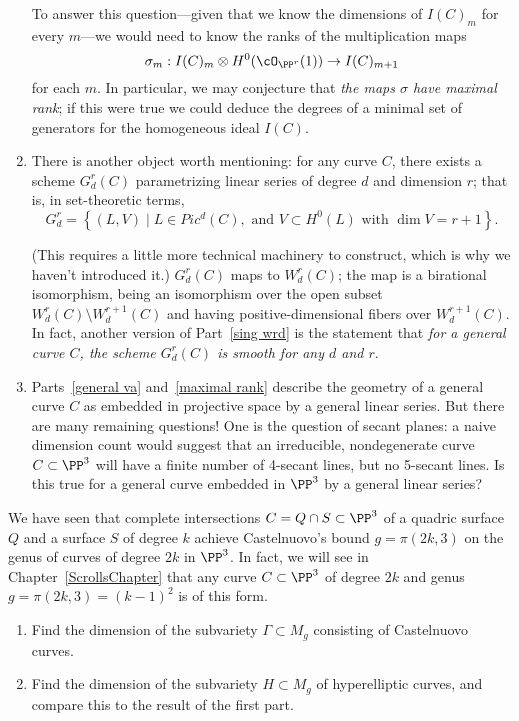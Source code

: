 \begin{enumerate}
To answer this question---given that we know the dimensions of $I(C)_m$ for every $m$---we would need to know the ranks of the multiplication maps
$$
\sigma_m : I(C)_m \otimes H^0(\cO_{\PP^r}(1)) \to I(C)_{m+1}
$$
for each $m$. In particular, we may conjecture that \emph{the maps $\sigma$ have maximal rank}; if this were true we could deduce the degrees of a minimal set of generators for the homogeneous ideal $I(C)$.

\item There is another object worth mentioning: for any curve $C$, there exists a scheme $G^r_d(C)$ parametrizing linear series of degree $d$ and dimension $r$; that is, in set-theoretic terms,
$$
G^r_d = \left\{ (L, V) \mid L \in Pic^d(C), \text{ and } V \subset H^0(L) \text{ with } \dim V = r+1 \right\}.
$$

(This requires a little more technical machinery to construct, which is why we haven't introduced it.) $G^r_d(C)$ maps to $W^r_d(C)$; the map is a birational isomorphism, being an isomorphism over the open subset $W^r_d(C) \setminus W^{r+1}_d(C)$ and having positive-dimensional fibers over $W^{r+1}_d(C)$. In fact, another version of Part~\ref{sing wrd} is the statement that \emph{for a general curve $C$, the scheme $G^r_d(C)$ is smooth for any $d$ and $r$}.

\item Parts~\ref{general va} and~\ref{maximal rank} describe the geometry of a general curve $C$ as embedded in projective space by a general linear series. But there are many remaining questions! One is the question of secant planes: a naive dimension count would suggest that an irreducible, nondegenerate curve $C \subset \PP^3$ will have a finite number of 4-secant lines, but no 5-secant lines. Is this true for a general curve embedded in $\PP^3$ by a general linear series?
\end{enumerate}

\begin{exercise}\label{rarity of Castelnuovo}
We have seen that complete intersections $C = Q \cap S \subset \PP^3$ of a quadric surface $Q$ and a surface $S$ of degree $k$ achieve Castelnuovo's bound $g = \pi(2k, 3)$ on the genus of curves of degree $2k$ in $\PP^3$. In fact, we will see in Chapter~\ref{ScrollsChapter} that any curve $C \subset \PP^3$ of degree $2k$ and genus $g = \pi(2k, 3) = (k-1)^2$ is of this form.
\begin{enumerate}
\item Find the dimension of the subvariety $\Gamma \subset M_g$ consisting of Castelnuovo curves.
\item Find the dimension of the subvariety $H \subset M_g$ of hyperelliptic curves, and compare this to the result of the first part.
\end{enumerate}
\end{exercise}


